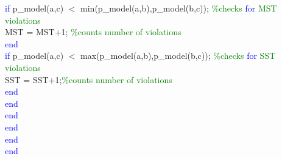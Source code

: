 \hspace{1mm}\indent \indent \indent \indent \indent \indent \indent \textcolor{blue}{if} p\_model(a,c) $<$ min(p\_model(a,b),p\_model(b,c)); \textcolor{green}{\%checks \textcolor{blue}{for} MST violations }\\ 
\hspace{1mm}\indent \indent \indent \indent \indent \indent \indent \indent \indent MST = MST+1; \textcolor{green}{\%counts number of violations }\\ 
\hspace{1mm}\indent \indent \indent \indent \indent \indent \indent \indent \textcolor{blue}{end} \\ 
\hspace{1mm}\indent \indent \indent \indent \indent \indent \indent \indent \textcolor{blue}{if} p\_model(a,c) $<$ max(p\_model(a,b),p\_model(b,c)); \textcolor{green}{\%checks \textcolor{blue}{for} SST violations }\\ 
\hspace{1mm}\indent \indent \indent \indent \indent \indent \indent \indent \indent \indent SST = SST+1;\textcolor{green}{\%counts number of violations }\\ 
\hspace{1mm}\indent \indent \indent \indent \indent \indent \indent \indent \indent \textcolor{blue}{end} \\ 
\hspace{1mm}\indent \indent \indent \indent \indent \indent \indent \indent \textcolor{blue}{end} \\ 
\hspace{1mm}\indent \indent \indent \indent \indent \indent \indent \textcolor{blue}{end} \\ 
\hspace{1mm}\indent \indent \indent \indent \indent \indent \textcolor{blue}{end} \\ 
\hspace{1mm}\indent \indent \indent \indent \indent \textcolor{blue}{end} \\ 
\hspace{1mm}\indent \indent \indent \indent \textcolor{blue}{end} \\ 
\hspace{1mm}\indent \indent \indent \indent  \\ 
\hspace{1mm}\indent \indent \indent \indent  \\ 
